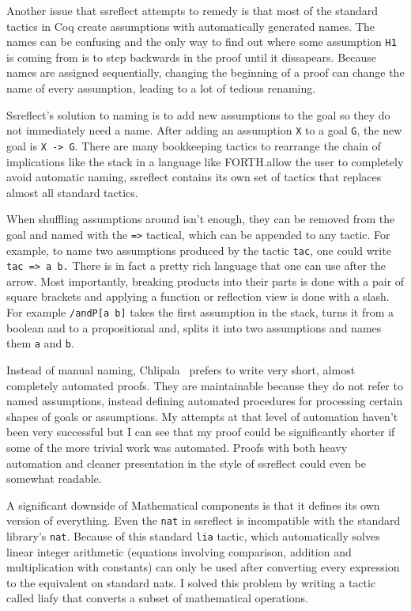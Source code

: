 \documentclass[english, 12pt, a4paper, sci, a-1b, online]{aaltothesis}
\newcommand\icoq[1]{\texttt{#1}}
\begin{document}
Another issue that ssreflect attempts to remedy is that most of the standard tactics in Coq create assumptions with automatically generated names. The names can be confusing and the only way to find out where some assumption \icoq{H1} is coming from is to step backwards in the proof until it dissapears. Because names are assigned sequentially, changing the beginning of a proof can change the name of every assumption, leading to a lot of tedious renaming.

Ssreflect's solution to naming is to add new assumptions to the goal so they do not immediately need a name. After adding an assumption \icoq{X} to a goal \icoq{G}, the new goal is \icoq{X -> G}. There are many bookkeeping tactics to rearrange the chain of implications like the stack in a language like FORTH.\@To allow the user to completely avoid automatic naming, ssreflect contains its own set of tactics that replaces almost all standard tactics.

When shuffling assumptions around isn't enough, they can be removed from the goal and named with the \icoq{=>} tactical, which can be appended to any tactic. For example, to name two assumptions produced by the tactic \icoq{tac}, one could write \icoq{tac => a b.} There is in fact a pretty rich language that one can use after the arrow. Most importantly, breaking products into their parts is done with a pair of square brackets and applying a function or reflection view is done with a slash. For example \icoq{/andP[a b]} takes the first assumption in the stack, turns it from a boolean and to a propositional and, splits it into two assumptions and names them \icoq{a} and \icoq{b}.

Instead of manual naming, Chlipala~\cite{CPDT} prefers to write very short, almost completely automated proofs. They are maintainable because they do not refer to named assumptions, instead defining automated procedures for processing certain shapes of goals or assumptions. My attempts at that level of automation haven't been very successful but I can see that my proof could be significantly shorter if some of the more trivial work was automated. Proofs with both heavy automation and cleaner presentation in the style of ssreflect could even be somewhat readable.

A significant downside of Mathematical components is that it defines its own version of everything. Even the \icoq{nat} in ssreflect is incompatible with the standard library's \icoq{nat}. Because of this standard \icoq{lia} tactic, which automatically solves linear integer arithmetic (equations involving comparison, addition and multiplication with constants) can only be used after converting every expression to the equivalent on standard nats. I solved this problem by writing a tactic called liafy that converts a subset of mathematical operations.
\end{document}
